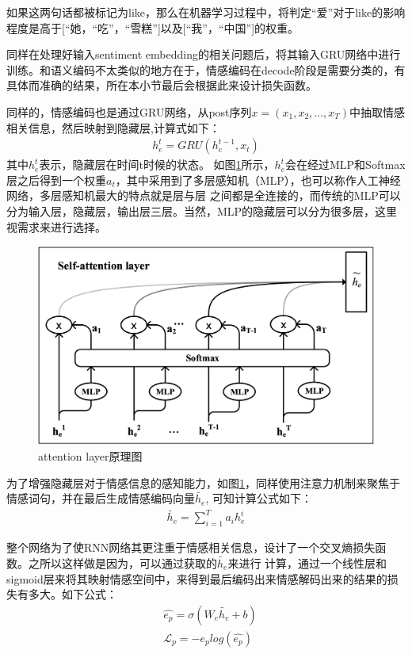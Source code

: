 \documentclass[supercite]{HustGraduPaper}
\theoremstyle{definition}
\begin{document}
如果这两句话都被标记为like，那么在机器学习过程中，将判定“爱”对于like的影响程度是高于[“她，“吃”，“雪糕”]以及[“我”，“中国”]的权重。

同样在处理好输入sentiment embedding的相关问题后，将其输入GRU网络中进行训练。和语义编码不太类似的地方在于，情感编码在decode阶段是需要分类的，有
具体而准确的结果，所在本小节最后会根据此来设计损失函数。

同样的，情感编码也是通过GRU网络，从post序列$x = (x_1,x_2,...,x_T)$中抽取情感相关信息，然后映射到隐藏层,计算式如下：
\begin{align}
  h_e^t = GRU(h_e^{t-1},x_t) \label{3.6}
\end{align}
其中$h_e^t$表示，隐藏层在时间t时候的状态。
如图\ref{Fig.attentionemotion}所示，$h_e^t$会在经过MLP和Softmax层之后得到一个权重$a_t$，其中采用到了多层感知机（MLP），也可以称作人工神经网络，多层感知机最大的特点就是层与层
之间都是全连接的，而传统的MLP可以分为输入层，隐藏层，输出层三层。当然，MLP的隐藏层可以分为很多层，这里视需求来进行选择。
\begin{figure}[!htb] %
  \centering %
  \includegraphics[width=1\textwidth]{images/attentionemotion.png} %
  \caption{attention layer原理图} %
  \label{Fig.attentionemotion} %
\end{figure}

为了增强隐藏层对于情感信息的感知能力，如图\ref{Fig.attentionemotion}，同样使用注意力机制来聚焦于情感词句，并在最后生成情感编码向量$\widetilde{h_e}$,
可知计算公式如下：
\begin{align}
  \widetilde{h_e} = \sum_{i=1}^{T}a_i h_e^i \label{3.7}
\end{align}

整个网络为了使RNN网络其更注重于情感相关信息，设计了一个交叉熵损失函数。之所以这样做是因为，可以通过获取的$\widetilde{h_e}$来进行
计算，通过一个线性层和sigmoid层来将其映射情感空间中，来得到最后编码出来情感解码出来的结果的损失有多大。如下公式：
\begin{align}
  &\hat{e_p} = \sigma(W_e \widetilde{h_e} + b) \label{3.8}\\
  &\mathcal{L}_p = -e_p log(\hat{e_p}) \label{3.9}
\end{align}
\end{document}
